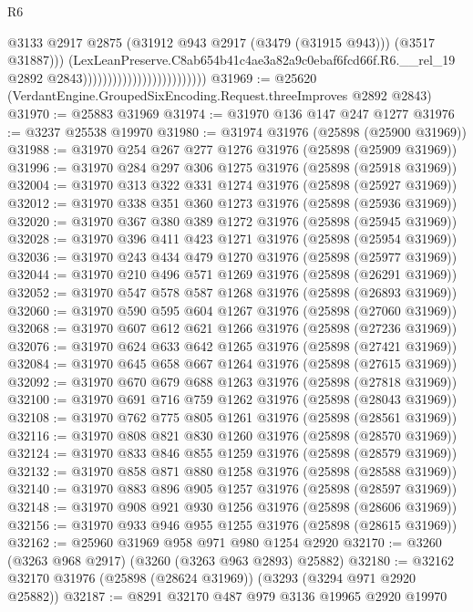 \begin{lexlean}{R6}
\begin{coremodule}
                                                        @3133
                                                        @2917
                                                        @2875
                                                        (@31912 @943 @2917 (@3479 (@31915 @943)))
                                                        (@3517 @31887)))
                                                    (LexLeanPreserve.C8ab654b41c4ae3a82a9c0ebaf6fcd66f.R6.__rel_19
                                                      @2892
                                                      @2843)))))))))))))))))))))))))
@31969 := @25620 (VerdantEngine.GroupedSixEncoding.Request.threeImproves @2892 @2843)
@31970 := @25883 @31969
@31974 := @31970 @136 @147 @247 @1277
@31976 := @3237 @25538 @19970
@31980 := @31974 @31976 (@25898 (@25900 @31969))
@31988 := @31970 @254 @267 @277 @1276 @31976 (@25898 (@25909 @31969))
@31996 := @31970 @284 @297 @306 @1275 @31976 (@25898 (@25918 @31969))
@32004 := @31970 @313 @322 @331 @1274 @31976 (@25898 (@25927 @31969))
@32012 := @31970 @338 @351 @360 @1273 @31976 (@25898 (@25936 @31969))
@32020 := @31970 @367 @380 @389 @1272 @31976 (@25898 (@25945 @31969))
@32028 := @31970 @396 @411 @423 @1271 @31976 (@25898 (@25954 @31969))
@32036 := @31970 @243 @434 @479 @1270 @31976 (@25898 (@25977 @31969))
@32044 := @31970 @210 @496 @571 @1269 @31976 (@25898 (@26291 @31969))
@32052 := @31970 @547 @578 @587 @1268 @31976 (@25898 (@26893 @31969))
@32060 := @31970 @590 @595 @604 @1267 @31976 (@25898 (@27060 @31969))
@32068 := @31970 @607 @612 @621 @1266 @31976 (@25898 (@27236 @31969))
@32076 := @31970 @624 @633 @642 @1265 @31976 (@25898 (@27421 @31969))
@32084 := @31970 @645 @658 @667 @1264 @31976 (@25898 (@27615 @31969))
@32092 := @31970 @670 @679 @688 @1263 @31976 (@25898 (@27818 @31969))
@32100 := @31970 @691 @716 @759 @1262 @31976 (@25898 (@28043 @31969))
@32108 := @31970 @762 @775 @805 @1261 @31976 (@25898 (@28561 @31969))
@32116 := @31970 @808 @821 @830 @1260 @31976 (@25898 (@28570 @31969))
@32124 := @31970 @833 @846 @855 @1259 @31976 (@25898 (@28579 @31969))
@32132 := @31970 @858 @871 @880 @1258 @31976 (@25898 (@28588 @31969))
@32140 := @31970 @883 @896 @905 @1257 @31976 (@25898 (@28597 @31969))
@32148 := @31970 @908 @921 @930 @1256 @31976 (@25898 (@28606 @31969))
@32156 := @31970 @933 @946 @955 @1255 @31976 (@25898 (@28615 @31969))
@32162 := @25960 @31969 @958 @971 @980 @1254 @2920
@32170 := @3260 (@3263 @968 @2917) (@3260 (@3263 @963 @2893) @25882)
@32180 := @32162 @32170 @31976 (@25898 (@28624 @31969)) (@3293 (@3294 @971 @2920 @25882))
@32187 := @8291 @32170 @487 @979 @3136 @19965 @2920 @19970

\end{coremodule}
\end{lexlean}
